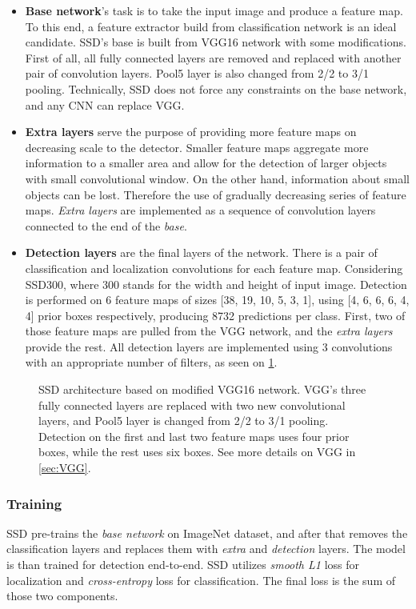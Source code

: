 \begin{itemize}
    \item \textbf{Base network}'s task is to take the input image and produce a feature map. To this end, a feature extractor build from classification network is an ideal candidate. SSD's base is built from VGG16 network with some modifications. First of all, all fully connected layers are removed and replaced with another pair of convolution layers. Pool5 layer is also changed from 2/2 to 3/1 pooling. Technically, SSD does not force any constraints on the base network, and any CNN can replace VGG.
    \item \textbf{Extra layers} serve the purpose of providing more feature maps on decreasing scale to the detector. Smaller feature maps aggregate more information to a smaller area and allow for the detection of larger objects with small convolutional window. On the other hand, information about small objects can be lost. Therefore the use of gradually decreasing series of feature maps. \textit{Extra layers} are implemented as a sequence of convolution layers connected to the end of the \textit{base}.
    \item \textbf{Detection layers} are the final layers of the network. There is a pair of classification and localization convolutions for each feature map. Considering SSD300, where 300 stands for the width and height of input image. Detection is performed on 6 feature maps of sizes [38, 19, 10, 5, 3, 1], using [4, 6, 6, 6, 4, 4] prior boxes respectively, producing 8732 predictions per class. First, two of those feature maps are pulled from the VGG network, and the \textit{extra layers} provide the rest. All detection layers are implemented using 3 convolutions with an appropriate number of filters, as seen on \cref{fig:VGGSSD}.
\end{itemize}

\begin{figure}
    \centering
    \VGGSSD
    \caption[SSD architecture]%
    {SSD architecture based on modified VGG16 network. VGG's three fully connected layers are replaced with two new convolutional layers, and Pool5 layer is changed from 2/2 to 3/1 pooling. Detection on the first and last two feature maps uses four prior boxes, while the rest uses six boxes. See more details on VGG in \cref{sec:VGG}.}
    \label{fig:VGGSSD}
\end{figure}


\subsubsection{Training}
SSD pre-trains the \textit{base network} on ImageNet dataset, and after that removes the classification layers and replaces them with \textit{extra} and \textit{detection} layers. The model is than trained for detection end-to-end. SSD utilizes \textit{smooth L1} loss for localization and \textit{cross-entropy} loss for classification. The final loss is the sum of those two components.

